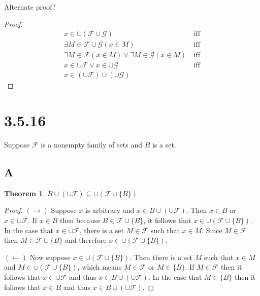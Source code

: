 \documentclass{article}
\newcommand{\F}{\mathcal{F}}
\newcommand{\G}{\mathcal{G}}
\newtheorem*{theorem}{Theorem}  %
\begin{document}
Alternate proof?
\begin{proof}
\begin{align*}
x \in \cup (\F \cup \G) ~ &\text{iff} \\
\exists M \in \F \cup \G (x \in M) ~ &\text{iff} \\
\exists M \in \F (x \in M) \lor \exists M \in \G (x \in M) ~ &\text{iff} \\
x \in \cup \F \lor x \in \cup \G ~ &\text{iff} \\
x \in (\cup \F) \cup (\cup \G)
\end{align*}
\end{proof}

\section*{3.5.16}
Suppose $\F$ is a nonempty family of sets and $B$ is a set.

\subsection*{A}
\begin{theorem} $B \cup (\cup \F) \subseteq \cup (\F \cup \{B\})$
\end{theorem}

\begin{proof}
$(\rightarrow)$ Suppose $x$ is arbitrary and $x \in B \cup (\cup \F)$. Then $x \in B$ or $x \in \cup \F$. If $x \in B$ then because $B \in \F \cup \{B\}$, it follows that $x \in \cup (\F \cup \{B\})$. In the case that $x \in \cup \F$, there is a set $M \in \F$ such that $x \in M$. Since $M \in \F$ then $M \in \F \cup \{B\}$ and therefore $x \in \cup (\F \cup \{B\})$.

$(\leftarrow)$ Now suppose $x \in \cup (\F \cup \{B\})$. Then there is a set $M$ such that $x \in M$ and $M \in \cup (\F \cup \{B\})$, which means $M \in \F$ or $M \in \{B\}$. If $M \in \F$ then it follows that $x \in \cup \F$ and thus $x \in B \cup (\cup \F)$. In the case that $M \in \{B\}$ then it follows that $x \in B$ and thus $x \in B \cup (\cup \F)$.  
\end{proof}
\end{document}
